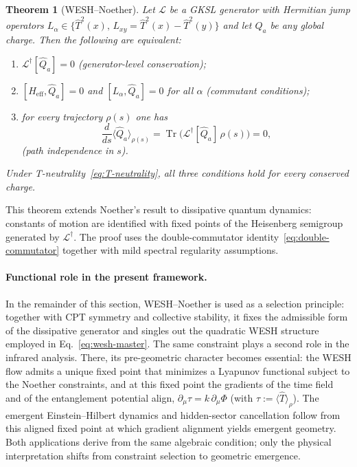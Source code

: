 \documentclass[12pt,a4paper]{article}
\newtheorem{theorem}{Theorem}[section]
\renewcommand{\Tr}{\operatorname{Tr}}
\numberwithin{equation}{section}
\begin{document}
\begin{theorem}[WESH--Noether]
\label{thm:wesh-noether}
Let $\mathcal{L}$ be a GKSL generator with Hermitian jump operators 
$L_\alpha \in \{\hat{T}^2(x),\, L_{xy} = \hat{T}^2(x) - \hat{T}^2(y)\}$ 
and let $\hat{Q}_a$ be any global charge. Then the following are equivalent:
\begin{enumerate}[label=(\roman*)]
\item $\mathcal{L}^\dagger[\hat{Q}_a] = 0$ \quad (generator-level conservation);
\item $[H_{\mathrm{eff}}, \hat{Q}_a] = 0$ and $[L_\alpha, \hat{Q}_a] = 0$ 
for all $\alpha$ \quad (commutant conditions);
\item for every trajectory $\rho(s)$ one has
\begin{equation}
\frac{d}{ds}\langle\hat{Q}_a\rangle_{\rho(s)} 
= \Tr\bigl(\mathcal{L}^\dagger[\hat{Q}_a]\,\rho(s)\bigr) = 0,
\label{eq:charge-conservation}
\end{equation}
\quad (path independence in $s$).
\end{enumerate}
Under T-neutrality~\eqref{eq:T-neutrality}, all three conditions hold for 
every conserved charge.
\end{theorem}

\noindent This theorem extends Noether's result to dissipative quantum dynamics:
constants of motion are identified with fixed points of the Heisenberg
semigroup generated by $\mathcal L^\dagger$. The proof uses the 
double-commutator identity~\eqref{eq:double-commutator} together with
mild spectral regularity assumptions.

\paragraph{Functional role in the present framework.}
In the remainder of this section, WESH--Noether is used as a selection 
principle: together with CPT symmetry and collective stability, it fixes 
the admissible form of the dissipative generator and singles out the 
quadratic WESH structure employed in Eq.~\eqref{eq:wesh-master}. The same 
constraint plays a second role in the infrared analysis. There, its 
pre-geometric character becomes essential: the WESH flow admits a unique 
fixed point that minimizes a Lyapunov functional subject to the Noether 
constraints, and at this fixed point the gradients of the time field and of the entanglement potential align, $\partial_\mu\tau = k\,\partial_\mu\Phi$ (with $\tau:=\langle\hat T\rangle_\rho$).
The emergent Einstein--Hilbert dynamics and hidden-sector cancellation 
follow from this aligned fixed point at which gradient alignment yields emergent geometry. Both applications derive from the same algebraic condition; only the 
physical interpretation shifts from constraint selection to geometric 
emergence.
\end{document}
